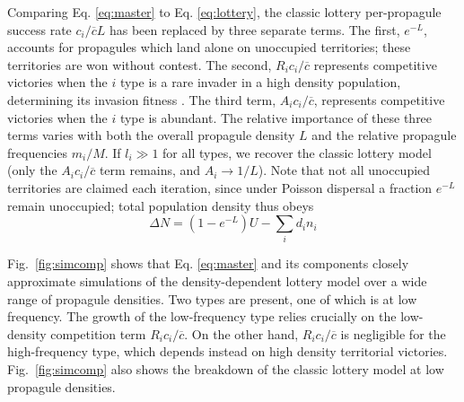 \documentclass[11pt]{article}
\begin{document}
Comparing Eq. \eqref{eq:master} to Eq. \eqref{eq:lottery}, the classic lottery per-propagule success rate $c_i/\overline{c}L$ has been replaced by three separate terms. The first, $e^{-L}$, accounts for propagules which land alone on unoccupied territories; these territories are won without contest. The second, $R_i c_i/\overline{c}$ represents competitive victories when the $i$ type is a rare invader in a high density population, determining its invasion fitness \citep{metz_1992}. The third term, $A_i c_i/\overline{c}$, represents competitive victories when the $i$ type is abundant. The relative importance of these three terms varies with both the overall propagule density $L$ and the relative propagule frequencies $m_i/M$. If $l_i\gg 1$ for all types, we recover the classic lottery model (only the $A_ic_i/\overline{c}$ term remains, and $A_i\rightarrow 1/L$). Note that not all unoccupied territories are claimed each iteration, since under Poisson dispersal a fraction $e^{-L}$ remain unoccupied; total population density thus obeys 
\begin{equation}
\Delta N=(1-e^{-L})U-\sum_i d_i n_i \label{eq:Nmaster}
\end{equation}

Fig.~\ref{fig:simcomp} shows that Eq. \eqref{eq:master} and its components closely approximate simulations of the density-dependent lottery model over a wide range of propagule densities. Two types are present, one of which is at low frequency. The growth of the low-frequency type relies crucially on the low-density competition term $R_i c_i/\overline{c}$. On the other hand, $R_i c_i/\overline{c}$ is negligible for the high-frequency type, which depends instead on high density territorial victories. Fig.~\ref{fig:simcomp} also shows the breakdown of the classic lottery model at low propagule densities.
\end{document}
